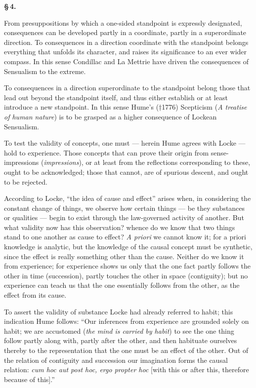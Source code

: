 \documentclass[12pt]{book}
\begin{document}
\begin{center}{\bfseries \S\,4.}\end{center}

From presuppositions by which a one-sided standpoint is expressly designated,
consequences can be developed partly in a coordinate, partly in a superordinate
direction. To consequences in a direction coordinate with the standpoint belongs
everything that unfolds its character, and raises its significance
to an ever wider compass. In this sense Condillac and La Mettrie have driven the
consequences of Sensualism to the extreme.

To consequences in a direction superordinate to the standpoint belong those that
lead out beyond the standpoint itself, and thus either establish or at least
introduce a new standpoint. In this sense Hume's (†1776) Scepticism (\textit{A
treatise of human nature}) is to be grasped as a higher consequence of Lockean
Sensualism.

To test the validity of concepts, one must --- herein Hume agrees with Locke ---
hold to experience. Those concepts that can prove their origin from
sense-impressions (\textit{impressions}), or at least from the reflections
corresponding to these, ought to be acknowledged; those that cannot, are of
spurious descent, and ought to be rejected.

According to Locke, ``the idea of cause and effect'' arises when, in considering
the constant change of things, we observe how certain things --- be they
substances or qualities --- begin to exist through the law-governed activity of
another. But what validity now has this observation? whence do we know that two
things stand to one another as cause to effect? \textit{A priori} we cannot know
it; for a priori knowledge is analytic, but the knowledge of the causal concept
must be synthetic, since the effect is really something other than the cause.
Neither do we know it from experience; for experience shows us only that the one
fact partly follows the other in time (succession),
partly touches the other in space (contiguity); but no experience can teach us
that the one essentially follows from the other, as the effect from its cause.

To assert the validity of substance Locke had already referred to habit; this
indication Hume follows: ``Our inferences from experience are grounded solely on
habit; we are accustomed (\textit{the mind is carried by habit}) to see the one
thing follow partly along with, partly after the other, and then habituate
ourselves thereby to the representation that the one
must be an effect of the other. Out of the relation of contiguity and succession
our imagination forms the causal relation: \textit{cum hoc aut post hoc, ergo
propter hoc} [with this or after this, therefore because of this].''
\end{document}
